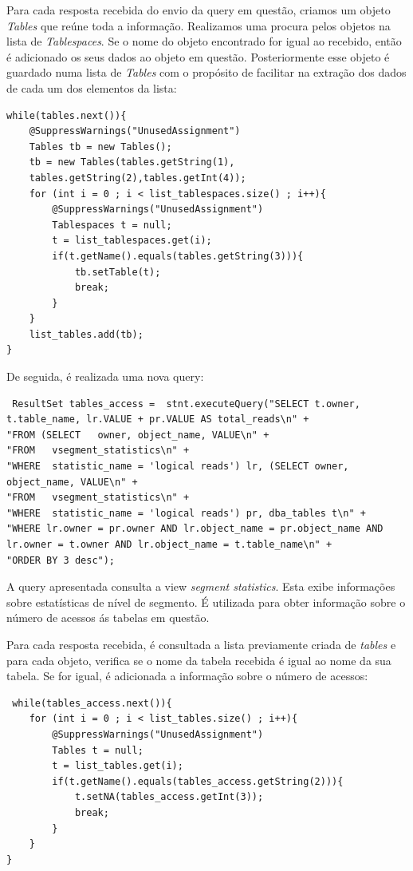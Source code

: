 Para cada resposta recebida do envio da query em questão,
criamos um objeto \textit{Tables} que reúne toda a informação. Realizamos uma procura pelos objetos  na lista de \textit{Tablespaces}. Se o nome do objeto encontrado for igual ao recebido, então é adicionado os seus dados ao objeto  em questão. Posteriormente esse objeto é guardado numa lista de \textit{Tables} com o propósito de facilitar na extração dos dados de cada um dos elementos da lista:
\vspace{2mm}
\begin{lstlisting}
while(tables.next()){
    @SuppressWarnings("UnusedAssignment")
    Tables tb = new Tables();
    tb = new Tables(tables.getString(1),
    tables.getString(2),tables.getInt(4));
    for (int i = 0 ; i < list_tablespaces.size() ; i++){
        @SuppressWarnings("UnusedAssignment")
        Tablespaces t = null;
        t = list_tablespaces.get(i);
        if(t.getName().equals(tables.getString(3))){
            tb.setTable(t);
            break;
        }
    }
    list_tables.add(tb);
}
\end{lstlisting}
\vspace{2mm}
De seguida, é realizada uma nova query:
\vspace{2mm}
\begin{lstlisting}
 ResultSet tables_access =  stnt.executeQuery("SELECT t.owner, t.table_name, lr.VALUE + pr.VALUE AS total_reads\n" +
"FROM (SELECT	owner, object_name, VALUE\n" +
"FROM	vsegment_statistics\n" +
"WHERE	statistic_name = 'logical reads') lr, (SELECT owner, object_name, VALUE\n" +
"FROM	vsegment_statistics\n" +
"WHERE	statistic_name = 'logical reads') pr, dba_tables t\n" +
"WHERE lr.owner = pr.owner AND lr.object_name = pr.object_name AND lr.owner = t.owner AND lr.object_name = t.table_name\n" +
"ORDER BY 3 desc");
\end{lstlisting}
\vspace{2mm}
A query apresentada consulta a view \textit{segment statistics}. Esta exibe informações sobre estatísticas de nível de segmento. É utilizada para obter informação sobre o número de acessos ás tabelas em questão.

Para cada resposta recebida, é consultada a lista previamente criada de \textit{tables} e para cada objeto, verifica se o nome da tabela recebida é igual ao nome da sua tabela. Se for igual, é adicionada a informação sobre o número de acessos:
\vspace{2mm}
\begin{lstlisting}
 while(tables_access.next()){
    for (int i = 0 ; i < list_tables.size() ; i++){
        @SuppressWarnings("UnusedAssignment")
        Tables t = null;
        t = list_tables.get(i);
        if(t.getName().equals(tables_access.getString(2))){
            t.setNA(tables_access.getInt(3));
            break;
        }
    }
}
\end{lstlisting}
